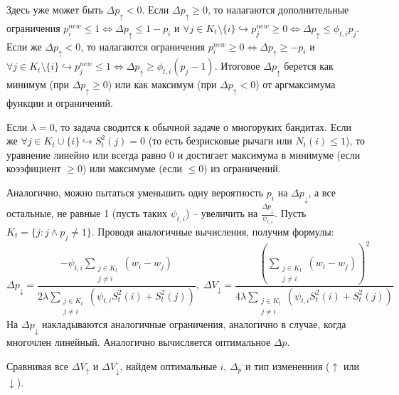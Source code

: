 \documentclass{article}
\begin{document}
\begin{enumerate}
$$    $$
    Здесь уже может быть $\Delta p_{\uparrow} < 0$. Если $\Delta p_{\uparrow} \geq 0$, то налагаются дополнительные ограничения $p_i^{new} \leq 1 \Leftrightarrow \Delta p_{\uparrow} \leq 1 - p_i$ и $\forall j \in K_t \setminus \{i\} \hookrightarrow p_j^{new} \geq 0 \Leftrightarrow \Delta p_{\uparrow} \leq \phi_{t,i} p_j$. Если же $\Delta p_{\uparrow} < 0$, то налагаются ограничения $p_i^{new} \geq 0 \Leftrightarrow \Delta p_{\uparrow} \geq -p_i$ и $\forall j \in K_t \setminus \{i\} \hookrightarrow p_j^{new} \leq 1 \Leftrightarrow \Delta p_{\uparrow} \geq \phi_{t,i} (p_j - 1)$. Итоговое $\Delta p_{\uparrow}$ берется как минимум (при $\Delta p_{\uparrow} \geq 0$) или как максимум (при $\Delta p_{\uparrow} < 0$) от аргмаксимума функции и ограничений.

     Если $\lambda = 0$, то задача сводится к обычной задаче о многоруких бандитах. Если же $\forall j \in K_t \cup \{i\} \hookrightarrow S_t^2(j) = 0$ (то есть безрисковые рычаги или $N_t(i) \leq 1$), то уравнение линейно или всегда равно 0 и достигает максимума в минимуме (если коээфициент $\geq 0$) или максимуме (если $\leq 0$) из ограничений.

     Аналогично, можно пытаться уменьшить одну вероятность $p_i$ на $\Delta p_{\downarrow}$, а все остальные, не равные 1 (пусть таких $\psi_{t,i}$) -- увеличить на $\frac{\Delta p_{\downarrow}}{\psi_{t,i}}$. Пусть $K_t = \{j: j \land p_j \neq 1 \}$. Проводя аналогичные вычисления, получим формулы:
     $$
     \Delta p_{\downarrow} = \frac{-\psi_{t,i} \sum_{\substack{j \in K_t \\ j \neq i}} (w_i - w_j)}{2\lambda \sum_{\substack{j \in K_t \\ j \neq i}} ( \psi_{t,i} S_t^2(i) + S_t^2(j) )}, \; \Delta V_{\downarrow} = \frac{\left( \sum_{\substack{j \in K_t \\ j \neq i}} (w_i - w_j) \right)^2}{4\lambda \sum_{\substack{j \in K_t \\ j \neq i}} ( \psi_{t,i} S_t^2(i) + S_t^2(j) )}
     $$
     На $\Delta p_{\downarrow}$ накладываются аналогичные ограничения, аналогично в случае, когда многочлен линейный. Аналогично вычисляется оптимальное $\Delta p$.

     Сравнивая все $\Delta V_{\uparrow}$ и $\Delta V_{\downarrow}$, найдем оптимальные $i, \, \Delta_p$ и тип измененния ($\uparrow$ или $\downarrow$).


\end{enumerate}
\end{document}

